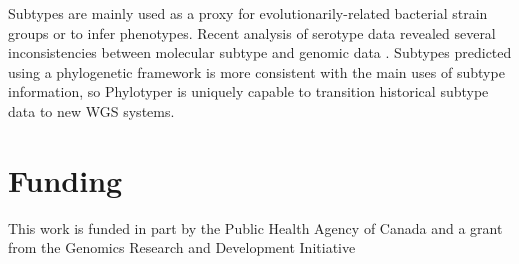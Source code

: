 \documentclass{bioinfo}
\begin{document}
Subtypes are mainly used as a proxy for evolutionarily-related bacterial strain groups or to infer phenotypes.
Recent analysis of serotype data revealed several inconsistencies between molecular subtype and genomic data \citep{DebRoy2016}.
Subtypes predicted using a phylogenetic framework is more consistent with the main uses of subtype information, so 
Phylotyper is uniquely capable to transition historical subtype data to new WGS systems.\vspace*{-10pt}

\section*{Funding}

This work is funded in part by the Public Health Agency of Canada and a grant from the Genomics Research and Development Initiative\vspace*{-12pt}




\end{document}

